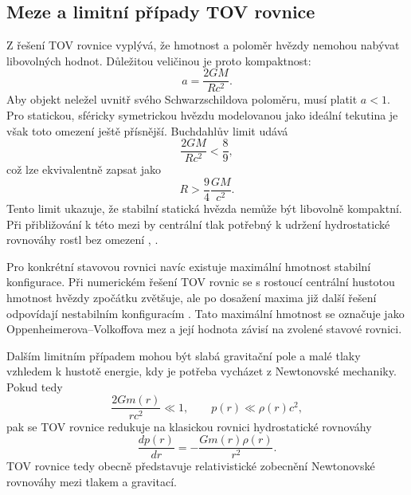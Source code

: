 \documentclass[%
final%
,htext%
]{ipothes}
\begin{document}
\subsection{Meze a limitní případy TOV rovnice}
Z řešení TOV rovnice vyplývá, že hmotnost a poloměr hvězdy nemohou nabývat libovolných hodnot. Důležitou veličinou je proto kompaktnost:
\begin{equation}
    a =
    \frac{2GM}{Rc^2}.
    \label{eq:compactness}
\end{equation}
Aby objekt neležel uvnitř svého Schwarzschildova poloměru, musí platit $a<1$. Pro statickou, sféricky symetrickou hvězdu modelovanou jako ideální tekutina je však toto omezení ještě přísnější. Buchdahlův limit udává
\begin{equation}
    \frac{2GM}{Rc^2}
    <
    \frac{8}{9},
    \label{eq:buchdahl_limit}
\end{equation}
což lze ekvivalentně zapsat jako
\begin{equation}
    R >
    \frac{9}{4}
    \frac{GM}{c^2}.
    \label{eq:buchdahl_radius}
\end{equation}
Tento limit ukazuje, že stabilní statická hvězda nemůže být libovolně kompaktní. Při přibližování k této mezi by centrální tlak potřebný k udržení hydrostatické rovnováhy rostl bez omezení \cite{buchdahl1959}, \cite{ghosh2007}.

Pro konkrétní stavovou rovnici navíc existuje maximální hmotnost stabilní konfigurace. Při numerickém řešení TOV rovnic se s rostoucí centrální hustotou hmotnost hvězdy zpočátku zvětšuje, ale po dosažení maxima již další řešení odpovídají nestabilním konfiguracím \cite{ghosh2007}. Tato maximální hmotnost se označuje jako Oppenheimerova--Volkoffova mez a její hodnota závisí na zvolené stavové rovnici.

Dalším limitním případem mohou být slabá gravitační pole a malé tlaky vzhledem k hustotě energie, kdy je potřeba vycházet z Newtonovské mechaniky. Pokud tedy
\begin{equation}
    \frac{2Gm(r)}{rc^2} \ll 1,
    \qquad
    p(r) \ll \rho(r)c^2,
    \label{eq:newtonian_limit_conditions}
\end{equation}
pak se TOV rovnice redukuje na klasickou rovnici hydrostatické rovnováhy
\begin{equation}
    \frac{dp(r)}{dr}
    =
    -
    \frac{Gm(r)\rho(r)}{r^2}.
    \label{eq:newtonian_hydrostatic_equilibrium}
\end{equation}
TOV rovnice tedy obecně představuje relativistické zobecnění Newtonovské rovnováhy mezi tlakem a gravitací.
\end{document}
